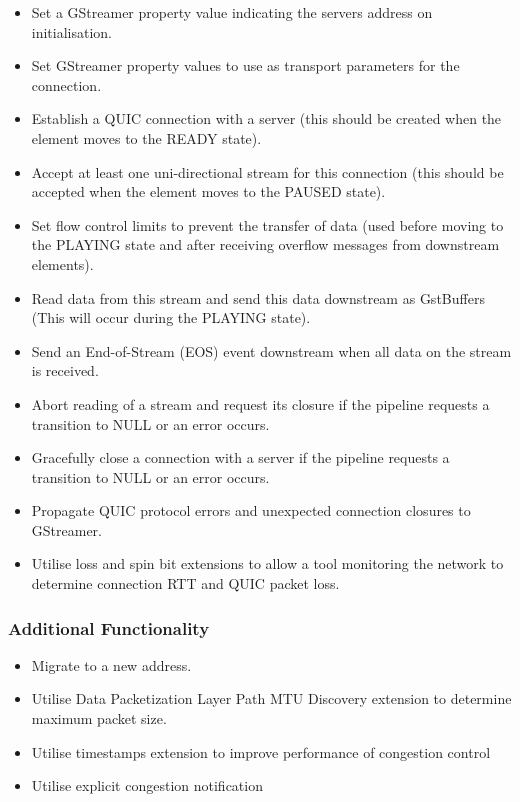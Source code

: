 \documentclass[11pt]{article}
\begin{document}
\begin{itemize}
    \item Set a GStreamer property value indicating the servers address on initialisation.
    \item Set GStreamer property values to use as transport parameters for the connection.
    \item Establish a QUIC connection with a server (this should be created when the element moves to the READY state).
    \item Accept at least one uni-directional stream for this connection (this should be accepted when the element moves to the PAUSED state).
    \item Set flow control limits to prevent the transfer of data (used before moving to the PLAYING state and after receiving overflow messages from downstream elements).
    \item Read data from this stream and send this data downstream as GstBuffers (This will occur during the PLAYING state).
    \item Send an End-of-Stream (EOS) event downstream when all data on the stream is received.
    \item Abort reading of a stream and request its closure if the pipeline requests a transition to NULL or an error occurs.
    \item Gracefully close a connection with a server if the pipeline requests a transition to NULL or an error occurs.
    \item Propagate QUIC protocol errors and unexpected connection closures to GStreamer.
    \item Utilise loss and spin bit extensions to allow a tool monitoring the network to determine connection RTT and QUIC packet loss.
\end{itemize}


\subsubsection{Additional Functionality}


\begin{itemize}
    \item Migrate to a new address.
    \item Utilise Data Packetization Layer Path MTU Discovery extension to determine maximum packet size.
    \item Utilise timestamps extension to improve performance of congestion control
    \item Utilise explicit congestion notification
\end{itemize}
\bigskip
\end{document}
